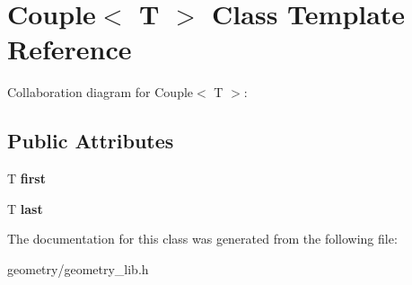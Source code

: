 \hypertarget{class_couple}{}\section{Couple$<$ T $>$ Class Template Reference}
\label{class_couple}


Collaboration diagram for Couple$<$ T $>$\+:
\subsection*{Public Attributes}
\begin{DoxyCompactItemize}
\item 
\mbox{\label{class_couple_a639e692ad6f62188103f63226f6fdf58}} 
T {\bfseries first}
\item 
\mbox{\label{class_couple_a5d88c738173b2e060df4e702f83e8ca5}} 
T {\bfseries last}
\end{DoxyCompactItemize}


The documentation for this class was generated from the following file\+:\begin{DoxyCompactItemize}
\item 
geometry/geometry\+\_\+lib.\+h\end{DoxyCompactItemize}
